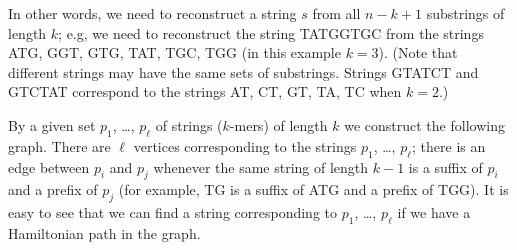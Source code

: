 In other words, we need to reconstruct a string $s$ from all $n - k + 1$
substrings of length $k$; e.g, we need to reconstruct the string TATGGTGC
from the strings ATG, GGT, GTG, TAT, TGC, TGG (in this example $k = 3$).
(Note that different strings may have the same sets of substrings.
Strings GTATCT and GTCTAT correspond to the strings
AT, CT, GT, TA, TC when $k = 2$.)

By a given set $p_1$, \dots, $p_\ell$ of strings ($k$-mers) of length $k$
we construct the following graph. There are $\ell$ vertices corresponding to
the strings $p_1$, \dots, $p_\ell$; there is an edge between $p_i$ and $p_j$
whenever the same string of length $k - 1$ is a suffix of $p_i$ and a
prefix of $p_j$ (for example, TG is a suffix of ATG and a prefix of TGG).
It is easy to see that we can find a string corresponding to
$p_1$, \dots, $p_\ell$ if we have a Hamiltonian path in the graph.


